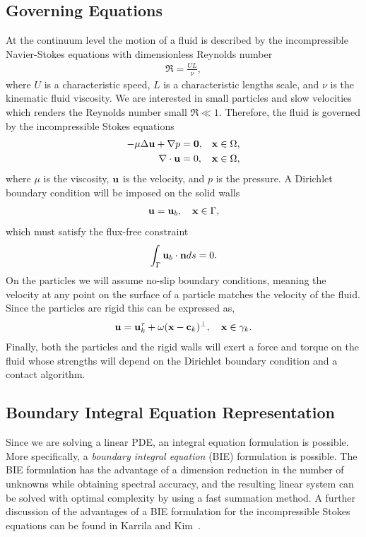 \documentclass[preprint, 10pt]{elsarticle}
\begin{document}
\subsection{Governing Equations}\label{sec:governing}
At the continuum level the motion of a fluid is described by the
incompressible Navier-Stokes equations with dimensionless Reynolds
number
\begin{align*}
  \Re = \frac{UL}{\nu},
\end{align*}
where $U$ is a characteristic speed, $L$ is a characteristic lengths
scale, and $\nu$ is the kinematic fluid viscosity.  We are interested in
small particles and slow velocities which renders the Reynolds number
small $\Re \ll 1$.  Therefore, the fluid is governed by the
incompressible Stokes equations
\begin{equation}
  \label{eq:stokes}
  \begin{aligned}
  -\mu\Delta \mathbf{u} + \nabla p &= \mathbf{0},
    &&{\mathbf{x}} \in \Omega, \\	  
  \nabla\cdot\mathbf{u} &= 0, && {\mathbf{x}} \in \Omega,
  \end{aligned}
\end{equation}
where $\mu$ is the viscosity, ${\mathbf{u}}$ is the velocity, and $p$ is the
pressure.  A Dirichlet boundary condition will be imposed on the solid
walls
\begin{align}
  \label{eq:boundary_condition}
  \mathbf{u} = \mathbf{u}_b, \quad {\mathbf{x}} \in \Gamma,
\end{align}
which must satisfy the flux-free constraint 
\begin{align}
  \label{eq:compatibility}
  \int_{\Gamma} {\mathbf{u}}_b\cdot{\mathbf{n}} ds = 0.
\end{align}
On the particles we will assume no-slip boundary conditions, meaning the
velocity at any point on the surface of a particle matches the velocity
of the fluid.  Since the particles are rigid this can be expressed as,
\begin{align}
  \label{eq:particles_noslip}
  {\mathbf{u}} = {\mathbf{u}}^\tau_k + \omega({\mathbf{x}}-{\mathbf{c}}_k)^\perp, \quad {\mathbf{x}} \in \gamma_k.
\end{align}
Finally, both the particles and the rigid walls will exert a force and
torque on the fluid whose strengths will depend on the Dirichlet
boundary condition and a contact algorithm.

\subsection{Boundary Integral Equation Representation}
Since we are solving a linear PDE, an integral equation formulation is
possible.  More specifically, a {\em boundary integral equation} (BIE)
formulation is possible.  The BIE formulation has the advantage of a
dimension reduction in the number of unknowns while obtaining spectral
accuracy, and the resulting linear system can be solved with optimal
complexity by using a fast summation method.  A further discussion of
the advantages of a BIE formulation for the incompressible Stokes
equations can be found in Karrila and Kim~\cite{Karrila1989}.
\end{document}
